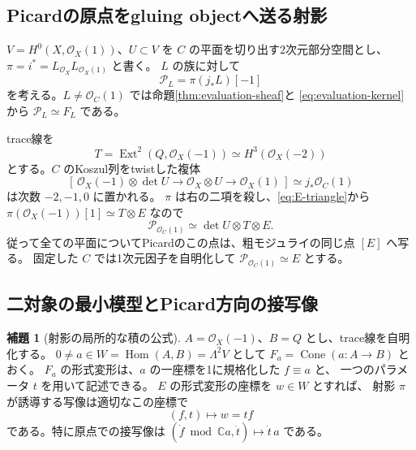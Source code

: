 \documentclass[a4paper,11pt]{ltjsarticle}
\theoremstyle{definition}
\newtheorem{lemma}[theorem]{補題}
\newcommand{\CC}{\mathbb C}
\newcommand{\OO}{\mathcal O}
\newcommand{\Ext}{\operatorname{Ext}}
\newcommand{\Hom}{\operatorname{Hom}}
\begin{document}
\subsection{Picardの原点をgluing objectへ送る射影}

$V=H^0(X,\OO_X(1))$、$U\subset V$ を $C$ の平面を切り出す2次元部分空間とし、
$\pi=i^*=L_{\OO_X}L_{\OO_X(1)}$ と書く。
$L$ の族に対して
\[
 \mathcal P_L=\pi(j_*L)[-1]
\]
を考える。$L\ne\OO_C(1)$ では命題\ref{thm:evaluation-sheaf}と
\eqref{eq:evaluation-kernel}から $\mathcal P_L\simeq F_L$ である。

trace線を
\[
 T=\Ext^2(Q,\OO_X(-1))\simeq H^3(\OO_X(-2))
\]
とする。$C$ のKoszul列をtwistした複体
\[
 [\,\OO_X(-1)\otimes\det U\longrightarrow
       \OO_X\otimes U\longrightarrow\OO_X(1)\,]
 \simeq j_*\OO_C(1)
\]
は次数 $-2,-1,0$ に置かれる。
$\pi$ は右の二項を殺し、\eqref{eq:E-triangle}から
$\pi(\OO_X(-1))[1]\simeq T\otimes E$ なので
\begin{equation}\label{eq:picard-special-object}
 \mathcal P_{\OO_C(1)}\simeq\det U\otimes T\otimes E.
\end{equation}
従って全ての平面についてPicardのこの点は、粗モジュライの同じ点 $[E]$ へ写る。
固定した $C$ では1次元因子を自明化して $\mathcal P_{\OO_C(1)}\simeq E$ とする。

\subsection{二対象の最小模型とPicard方向の接写像}

\begin{lemma}[射影の局所的な積の公式]\label{lem:mutation-product}
$A=\OO_X(-1)$、$B=Q$ とし、trace線を自明化する。
$0\ne a\in W=\Hom(A,B)=\Lambda^2V$ として
$F_a=\operatorname{Cone}(a:A\to B)$ とおく。
$F_a$ の形式変形は、$a$ の一座標を1に規格化した $f\equiv a$ と、
一つのパラメータ $t$ を用いて記述できる。
$E$ の形式変形の座標を $w\in W$ とすれば、
射影 $\pi$ が誘導する写像は適切なこの座標で
\[
                       (f,t)\longmapsto w=tf
\]
である。特に原点での接写像は
$(\dot f\bmod\CC a,\dot t)\mapsto\dot t\,a$ である。
\end{lemma}
\end{document}
